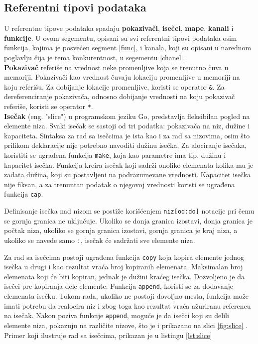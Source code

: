 \documentclass[12pt,oneside]{memoir}
\begin{document}
\subsection{Referentni tipovi podataka}
U referentne tipove podataka spadaju \textbf{pokazivači}, \textbf{isečci}, \textbf{mape}, \textbf{kanali} i \textbf{funkcije}. U ovom segementu, opisani su svi referentni tipovi podataka osim funkcija, kojima je posvećen segment \ref{func}, i kanala, koji su opisani u narednom poglavlju čija je tema konkurentnost, u segementu \ref{chanel}. 
\\

\textbf{Pokazivač} referiše na vrednost neke promenljive koja se trenutno čuva u memoriji. Pokazivači kao vrednost čuvaju lokaciju promenljive u memoriji na koju referišu. Za dobijanje lokacije promenljive, koristi se operator \texttt{\&}. Za dereferenciranje pokazivača, odnosno dobijanje vrednosti na koju pokazivač referiše, koristi se operator \texttt{*}.
\\

\textbf{Isečak} (eng. "slice") u programskom jeziku Go, predstavlja fleksibilan pogled na elemente niza. Svaki isečak se sastoji od tri podatka: pokazivača na niz, dužine i kapaciteta. Sintaksa za rad sa isečcima je ista kao i za rad sa nizovima, osim što prilikom deklaracije nije potrebno navoditi dužinu isečka. Za alociranje isečaka, koristiti se ugrađena funkcija \texttt{make}, koja kao parametre ima tip, dužinu i kapacitet isečka. Funkcija kreira isečak koji sadrži onoliko elemenata kolika mu je zadata dužina, koji su postavljeni na podrazumevane vrednosti. Kapacitet isečka nije fiksan, a za trenuntan podatak o njegovoj vrednosti koristi se ugrađena funkcija \texttt{cap}.

Definisanje isečka nad nizom se postiže korišćenjem \texttt{niz[od:do]} notacije pri čemu se gornja granica ne uključuje. Ukoliko se donja granica izostavi, donja granica je počtak niza, ukoliko se gornja granica izostavi, gornja granica je kraj niza, a ukoliko se navede samo \texttt{:}, isečak će sadržati sve elemente niza. 

Za rad sa isečcima postoji ugrađena funkcija \texttt{copy} koja kopira elemente jednog isečka u drugi i kao rezultat vraća broj kopiranih elemenata. Maksimalan broj elemenata koji će biti kopiran, jednak je dužini kraćeg isečka. Dozvoljeno je da isečci pre kopiranja dele elemente. Funkcija \texttt{append}, koristi se za dodavanje elemenata isečku. Tokom rada, ukoliko ne postoji dovoljno mesta, funkcija može imati potrebu da realocira niz i zbog toga kao rezultat vraća ažuriranu referencu na isečak. Nakon poziva funkcije \texttt{append}, moguće je da isečci koji su delili elemente niza, pokazuju na različite nizove, što je i prikazano na slici \ref{fig:slice} \cite{bookGoProg}. Primer koji ilustruje rad sa isečcima, prikazan je u listingu \ref{lst:slice}
\end{document}
